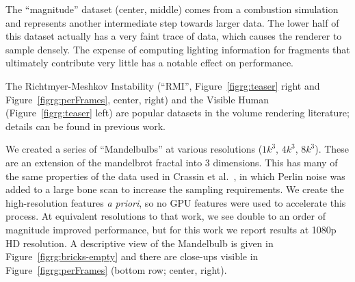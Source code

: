 The ``magnitude'' dataset (center, middle) comes from a combustion
simulation and represents another intermediate step towards larger
data.  The lower half of this dataset actually has a very faint trace
of data, which causes the renderer to sample densely.  The expense
of computing lighting information for fragments that ultimately
contribute very little has a notable effect on performance.

The Richtmyer-Meshkov Instability (``RMI'',
Figure~\ref{figrg:teaser} right and Figure~\ref{figrg:perFrames}, center,
right) and the Visible Human (Figure~\ref{figrg:teaser} left) are popular
datasets in the volume rendering literature; details can be found in
previous work.

We created a series of ``Mandelbulbs'' at various resolutions ($1k^3$,
$4k^3$, $8k^3$).  These are an extension of the mandelbrot fractal into
3 dimensions.  This has many of the same properties of the data used in
Crassin et al.~\cite{Crassin:2009:Gigavoxels}, in which Perlin noise
was added to a large bone scan to increase the sampling requirements.
We
create the high-resolution features \textit{a priori}, so no GPU
features were used to accelerate this process.  At equivalent
resolutions to that work, we see double to an order of magnitude
improved performance, but for this work we report results at 1080p HD
resolution.  A descriptive view of the Mandelbulb is
given in Figure~\ref{figrg:bricks-empty} and there
are close-ups visible in Figure~\ref{figrg:perFrames} (bottom row;
center, right).

